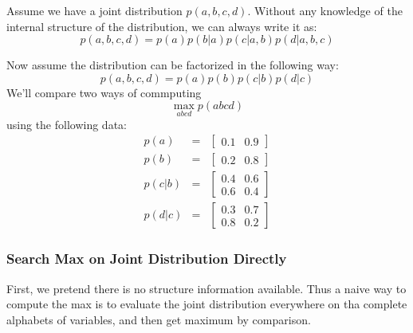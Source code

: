 \documentclass[11pt,a4paper]{article}
\begin{document}
Assume we have a joint distribution $p(a,b,c,d)$. 
Without any knowledge of the internal structure of the distribution, 
we can always write it as:
\begin{equation}
	p(a,b,c,d) = p(a)p(b|a)p(c|a,b)p(d|a,b,c)
\end{equation}

Now assume the distribution can be factorized in the following way:
\begin{equation}
	p(a,b,c,d) = p(a)p(b)p(c|b)p(d|c)
	\label{eq:toy_chain}
\end{equation}
We'll compare two ways of commputing \
$$\max_{abcd}{p(abcd)}$$
 using the following data:
\begin{eqnarray}
	p(a) &=& \left[
	\begin{matrix}
	0.1 & 0.9
	\end{matrix}
	\right] \\
	p(b) &=& \left[
	\begin{matrix}
	0.2 & 0.8
	\end{matrix}
	\right] \\
	p(c|b) &=& \left[
	\begin{matrix}
	0.4 & 0.6 \\
	0.6 & 0.4
	\end{matrix}
	\right] \\
	p(d|c) &=& \left[
	\begin{matrix}
	0.3 & 0.7 \\
	0.8 & 0.2
	\end{matrix}
	\right] 
\end{eqnarray}

\subsubsection{Search Max on Joint Distribution Directly}
First, we pretend there is no structure information available. 
Thus a naive way to compute the max is to evaluate the joint distribution 
everywhere on tha complete alphabets of variables, and then get 
maximum by comparison. 
\end{document}
